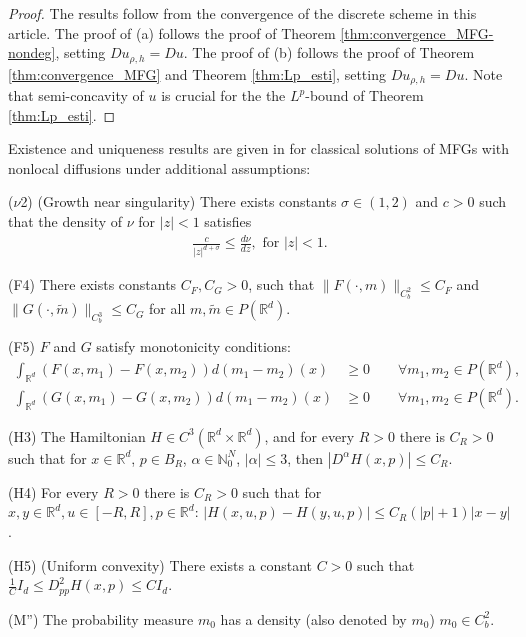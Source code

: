 \documentclass[a4paper,  twoside, 10pt, leqno]{amsart}
\newcommand{\R}{\mathbb{R}}
\newcommand{\rd}{\mathbb{R}^d}
\theoremstyle{remark}
\theoremstyle{definition}
\newenvironment{description*}%
  {\begin{description}
    \setlength{\itemsep}{0.33em}
  }
  {\end{description}}
\begin{document}
\begin{proof}
The results  follow from the convergence of the discrete scheme in this article. The proof of (a) follows the proof of Theorem \ref{thm:convergence_MFG-nondeg}, setting
$Du_{\rho,h} = Du$. 
The proof of (b) follows the proof of Theorem \ref{thm:convergence_MFG} and Theorem \ref{thm:Lp_esti}, setting $Du_{\rho,h} = Du$. Note that semi-concavity of $u$ is crucial for the the $L^p$-bound of Theorem \ref{thm:Lp_esti}.
\end{proof}


Existence and uniqueness results are given in \cite{ersland2020classical}  for classical solutions of MFGs with nonlocal diffusions under additional assumptions:
\begin{description*}

    \item[($\nu$2)\label{nu3}](Growth near singularity) There exists constants $\sigma \in (1,2)$ and $c>0$ such that the density of $\nu$ for $|z|<1$ satisfies
        \begin{align*}
            \frac{c}{|z|^{d+\sigma}} \leq  \frac{d\nu}{dz}, \text{ for } |z| < 1.
        \end{align*} \smallskip
    \item[(F4)\label{F4}] There exists constants $C_{F}, C_{G} > 0$, 
        such that $\| F ( \cdot,m ) \|_{C_{b}^{2}} \leq C_{F} $ and 
        $\| G ( \cdot, \tilde{m} )  \|_{C_{b}^{3}} \leq C_{G}$ 
        for all $m, \tilde{m} \in P ( \rd )$. \smallskip
           \item[(F5)\label{F5}] $F$ and $G$ satisfy monotonicity conditions: 
\begin{align*}
    \int_{\R^d} \left( F \left( x, m_1 \right) - F \left( x, m_2 \right) \right) d \left( m_1 -m_2 \right) \left( x \right) &\geq 0 \qquad \forall m_1,m_2 \in P ( \R^d ), \\[0.2cm]
  \int_{\R^d} \left( G \left( x, m_1 \right) - G \left( x, m_2 \right) \right) d \left( m_1 -m_2 \right) \left( x \right) &\geq 0 \qquad \forall m_1,m_2 \in P ( \R^d ).
\end{align*}
   \smallskip
    \item[(H3)\label{H3}] The Hamiltonian $H \in C^3 ( \rd \times \rd ) $, and for every $R>0$ there is  $C_{R} >0$ such that for 
        $x \in \rd$, $p \in B_{R}$, $\alpha \in \mathbb{N}_{0}^{N}$, 
        $ | \alpha | \leq 3$, then 
        $|D^{\alpha} H ( x,p ) | \leq C_{R}$. \smallskip 
    \item[(H4)\label{H4}] For every $R > 0$ there is $C_R >0$ such that for $x,y \in \R^d, u \in \left[ -R,R \right], p \in \R^d$: $|H \left( x,u,p \right) - H \left( y,u,p \right)| \leq C_R \left( |p|+1 \right) |x-y|$. \smallskip
    \item[(H5)\label{H5}] (Uniform convexity) There exists a constant $C >0$ such that $\frac{1}{C} I_d \leq D_{pp}^2 H \left( x,p \right) \leq C I_d$.  \smallskip
    \item[(M'')\label{M111}] The probability measure $m_{0}$ has a 
    density (also denoted by $m_0$) $m_{0} \in C_{b}^{2}$. \smallskip
\end{description*}
\end{document}

